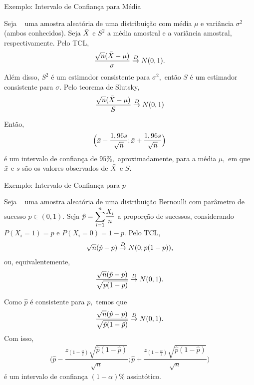 \documentclass[12pt]{beamer}
\begin{document}
\begin{frame}{Exemplo: Intervalo de Confiança para Média}
\begin{block}{}
\justifying
Seja \seqX~ uma amostra aleatória de uma distribuição com média $\mu$ e variância $\sigma^{2}$ (ambos conhecidos). Seja $\Bar{X}$ e $S^{2}$ a média amostral e a variância amostral, respectivamente. Pelo TCL,
\begin{align*}
    \dfrac{\sqrt{n}(\Bar{X}-\mu)}{\sigma}\overset{D}{\rightarrow} N(0,1).
\end{align*}
Além disso, $S^{2}$ é um estimador consistente para $\sigma^{2},$ então $S$ é um estimador consistente para $\sigma.$ Pelo teorema de Slutsky,
\begin{align*}
    \dfrac{\sqrt{n}(\Bar{X}-\mu)}{S}\overset{D}{\rightarrow} N(0,1)
\end{align*}
\end{block}
\end{frame}

\begin{frame}{}
\begin{block}{}
\justifying
Então,
\begin{align*}
    \Big(\Bar{x}-\dfrac{1,96s}{\sqrt{n}};\Bar{x}+\dfrac{1,96s}{\sqrt{n}}\Big)
\end{align*}
é um intervalo de confiança de $95\%,$ aproximadamente, para a média $\mu,$ em que $\Bar{x}$ e $s$ são os valores observados de $\Bar{X}$ e $S.$
\end{block}
\end{frame}

\begin{frame}{Exemplo: Intervalo de Confiança para $p$}
\begin{block}{}
\justifying
Seja \seqX~ uma amostra aleatória de uma distribuição Bernoulli com parâmetro de sucesso $p\in(0,1).$ Seja $\hat{p}={\displaystyle \sum_{i=1}^{n}} \dfrac{X_{i}}{n}$ a proporção de sucessos, considerando $P(X_{i}=1)=p$ e $P(X_{i}=0)=1-p.$ Pelo TCL,
\begin{align*}
    \sqrt{n}(\hat{p}-p)\overset{D}{\rightarrow} N(0,p(1-p)),
\end{align*}
ou, equivalentemente,
\begin{align*}
    \dfrac{\sqrt{n}(\hat{p}-p)}{\sqrt{p(1-p)}}\overset{D}{\rightarrow} N(0,1).
\end{align*}
\end{block}
\end{frame}

\begin{frame}{}
\begin{block}{}
\justifying
Como $\hat{p}$ é consistente para $p,$ temos que
\begin{align*}
    \dfrac{\sqrt{n}(\hat{p}-p)}{\sqrt{\hat{p}(1-\hat{p})}}\overset{D}{\rightarrow} N(0,1).
\end{align*}
Com isso, 
\begin{align*}
    \Big(\hat{p}-\dfrac{z_{(1-\frac{\alpha}{2})}\sqrt{\hat{p}(1-\hat{p})}}{\sqrt{n}};\hat{p}+\dfrac{z_{(1-\frac{\alpha}{2})}\sqrt{\hat{p}(1-\hat{p})}}{\sqrt{n}}\Big)
\end{align*}
é um intervalo de confiança $(1-\alpha)\%$ assintótico.
\end{block}
\end{frame}
\end{document}
